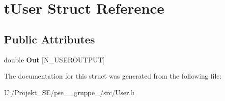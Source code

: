 \hypertarget{structt_user}{}\section{t\+User Struct Reference}
\label{structt_user}
\subsection*{Public Attributes}
\begin{DoxyCompactItemize}
\item 
\mbox{\label{structt_user_a8c379822623bca595f42c4d1dff876bb}} 
double {\bfseries Out} \mbox{[}N\+\_\+\+U\+S\+E\+R\+O\+U\+T\+P\+UT\mbox{]}
\end{DoxyCompactItemize}


The documentation for this struct was generated from the following file\+:\begin{DoxyCompactItemize}
\item 
U\+:/\+Projekt\+\_\+\+S\+E/pse\+\_\+\_\+gruppe\+\_/src/User.\+h\end{DoxyCompactItemize}
